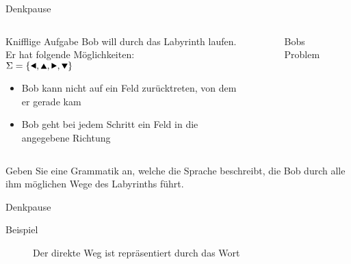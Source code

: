 {
\begin{frame}{Denkpause}
  \begin{columns}
    \begin{alertblock}{Knifflige Aufgabe}
      Bob will durch das Labyrinth laufen. Er hat folgende Möglichkeiten:\\
      $\Sigma = \{\text{\Rewind}, \text{\MoveUp}, \text{\Forward}, \text{\MoveDown}\}$
      \begin{itemize}
        \item Bob kann nicht auf ein Feld zurücktreten, von dem er gerade kam
        \item Bob geht bei jedem Schritt ein Feld in die angegebene Richtung
      \end{itemize}
    \end{alertblock}
    \begin{figure}
      \centering
      
      \caption{Bobs Problem}

    \end{figure}
  \end{columns}
  \alert{Geben Sie eine Grammatik an, welche die Sprache beschreibt, die Bob durch alle ihm möglichen Wege des Labyrinths führt.}
\end{frame}
}

{
\begin{frame}{Denkpause}
  \begin{alertblock}{Beispiel}
    \begin{figure}
      \centering
      \def\labyrinthVariant{Direkt}
      \def\labyrinthSize{0.9\textwidth}
      
      \caption{Der direkte Weg ist repräsentiert durch das Wort \alert{\MoveDown\Forward\Forward\Forward\Forward\Forward\Forward}}
    \end{figure}
  \end{alertblock}
\end{frame}
}

